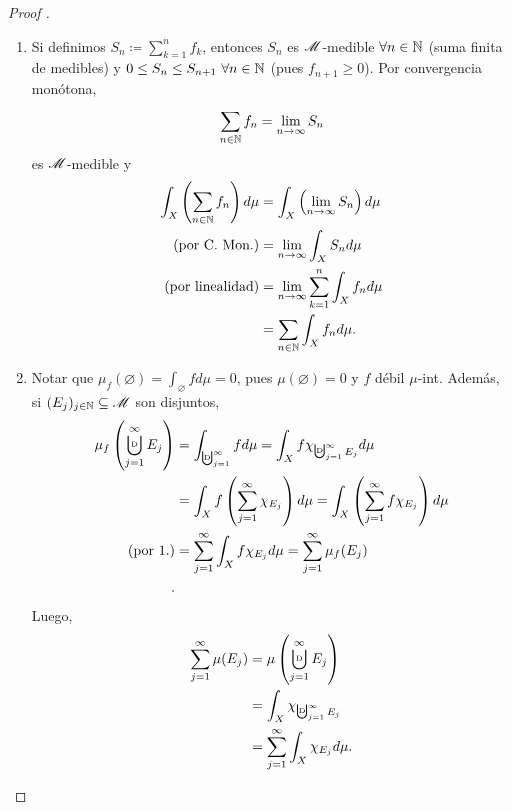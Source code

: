 \begin{proof}[Proof ]
	\begin{enumerate}
		\item Si definimos $S_{n} \coloneq \sum_{k=1}^{n} f_{k}$, entonces $S_{n}$ es $\mathscr{M}$-medible $\forall n\in\mathbb{N}$ (suma finita de medibles) y $0 \leq S_{n} \leq S_{n+1} \ \forall n \in \mathbb{N}$ (pues $f_{n+1} \geq 0$). Por convergencia monótona,
		\[ \sum_{n\in\mathbb{N}}^{} f_{n} = \lim_{n \to \infty} S_{n} \]
		es $\mathscr{M}$-medible y
		\begin{align*}
			\int_{X} \left( \sum_{n\in\mathbb{N}}^{} f_n \right) d\mu &= \int_{X} \left(\lim_{n \to \infty} S_{n} \right) d\mu \\
			(\text{por C. Mon.}) &= \lim_{n \to \infty} \int_{X} S_{n} d\mu \\
			(\text{por linealidad}) &= \lim_{n \to \infty} \sum_{k=1}^{n} \int_{X} f_{n} d\mu \\
			&= \sum_{n\in\mathbb{N}}^{} \int_{X} f_{n} d\mu.
		\end{align*}

		\item Notar que $\mu_{f}(\varnothing) = \int_{\varnothing} f d\mu = 0$, pues $\mu(\varnothing) = 0$ y $f$ débil $\mu$-int. Además, si $(E_{j})_{j\in\mathbb{N}} \subseteq \mathscr{M}$ son disjuntos,
		\begin{align*}
			\mu_{f}\left(\bigcupd_{j=1}^{\infty} E_{j} \right) &= \int_{\textbigcupd_{j=1}^{\infty}} f d\mu = \int_{X} f \chi_{\textbigcupd_{j=1}^{\infty} E_{j}} d\mu \\
			&= \int_{X} f \left( \sum_{j=1}^{\infty} \chi_{E_{j}} \right) d\mu = \int_{X} \left( \sum_{j=1}^{\infty} f \chi_{E_{j}} \right) d\mu \\
			(\text{por } 1.) &= \sum_{j=1}^{\infty} \int_{X} f \chi_{E_{j}} d\mu = \sum_{j=1}^{\infty} \mu_{f}(E_{j}) \\
		.\end{align*}	
		Luego,
		\begin{align*}
			\sum_{j=1}^{\infty} \mu(E_{j}) &= \mu \left( \bigcupd_{j=1}^{\infty} E_{j} \right) \\
			&= \int_{X} \chi_{\textbigcupd_{j=1}^{\infty} E_{j}} \\
			&= \sum_{j=1}^{\infty} \int_{X} \chi_{E_{j}} d\mu
		.\qedhere\end{align*}
	\end{enumerate}
\end{proof}

